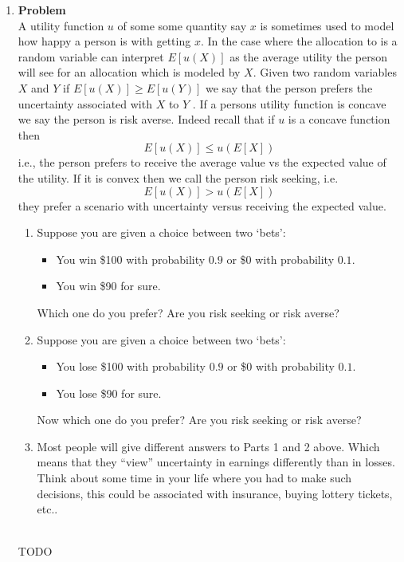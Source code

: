 \documentclass[12pt]{article}
\newenvironment{Ex}{\textbf{Problem}\vspace{.75em}\\}{}
\begin{document}
\begin{enumerate}
\begin{Ex}
      \begin{solution} \hfill \\
        {\huge TODO}
      \end{solution}
    \end{Ex}
  \item
    \begin{Ex}
      A utility function $u$ of some some quantity say $x$ is sometimes
      used to model how happy a person is with getting $x$. In the case
      where the allocation to is a random variable can interpret
      $E[u(X)]$ as the average utility the person will see for an
      allocation which is modeled by $X$. Given two random variables $X$
      and $Y$ if $E [u(X)] \ge E [u(Y)]$ we say that the person prefers
      the uncertainty associated with $X$ to $Y$ . If a persons utility
      function is concave we say the person is risk averse. Indeed
      recall that if $u$ is a concave function then
      $$ E[u(X)] \le u(E[X]) $$
      i.e., the person prefers to receive the average value vs the
      expected value of the utility. If it is convex then we call the
      person risk seeking, i.e.
      $$ E[u(X)] \gt u(E[X]) $$
      they prefer a scenario with uncertainty versus receiving the expected value.
      \begin{enumerate}
      \item Suppose you are given a choice between two `bets':
        \begin{itemize}
        \item You win \$100 with probability $0.9$ or \$0 with
          probability $0.1$.
        \item You win \$90 for sure.
        \end{itemize}
        Which one do you prefer? Are you risk
        seeking or risk averse?
      \item Suppose you are given a choice
        between two `bets':
        \begin{itemize}
        \item You lose \$100 with probability $0.9$ or \$0 with
          probability $0.1$.
        \item You lose \$90 for sure.
        \end{itemize}
        Now which one do you prefer? Are you risk seeking or risk averse?
      \item Most people will give different answers to Parts 1 and 2
        above. Which means that they ``view'' uncertainty in earnings
        differently than in losses. Think about some time in your life
        where you had to make such decisions, this could be associated
        with insurance, buying lottery tickets, etc..
      \end{enumerate}
      \begin{solution} \hfill \\
        {\huge TODO}
      \end{solution}
    \end{Ex}
  \end{enumerate}
\end{document}
